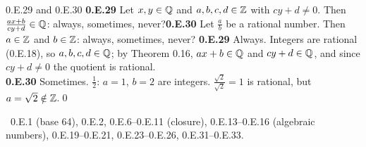 \begin{bookex}[recommended]{0.E.29 and 0.E.30}
\textbf{0.E.29} Let $x,y\in\mathbb{Q}$ and $a,b,c,d\in\mathbb{Z}$ with $cy+d\ne0$. Then $\frac{ax+b}{cy+d}\in\mathbb{Q}$: always, sometimes, never?\quad \textbf{0.E.30} Let $\frac ab$ be a rational number. Then $a\in\mathbb{Z}$ and $b\in\mathbb{Z}$: always, sometimes, never?
\solution
\textbf{0.E.29} Always. Integers are rational (0.E.18), so $a,b,c,d\in\mathbb{Q}$; by Theorem 0.16, $ax+b\in\mathbb{Q}$ and $cy+d\in\mathbb{Q}$, and since $cy+d\ne0$ the quotient is rational.\\
\textbf{0.E.30} Sometimes. $\frac12$: $a=1$, $b=2$ are integers. $\frac{\sqrt2}{\sqrt2}=1$ is rational, but $a=\sqrt2\notin\mathbb{Z}$.\qed
\end{bookex}

\begin{trybox}
\fO\ 0.E.1 (base 64), 0.E.2, 0.E.6--0.E.11 (closure), 0.E.13--0.E.16 (algebraic numbers), 0.E.19--0.E.21, 0.E.23--0.E.26, 0.E.31--0.E.33.
\end{trybox}
